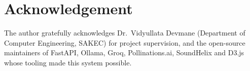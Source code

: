 \documentclass[conference,10pt,a4paper]{IEEEtran}
\begin{document}
\section*{Acknowledgement}
The author gratefully acknowledges Dr.\ Vidyullata Devmane (Department
of Computer Engineering, SAKEC) for project supervision, and the
open-source maintainers of FastAPI, Ollama, Groq, Pollinations.ai,
SoundHelix and D3.js whose tooling made this system possible.



\end{document}
